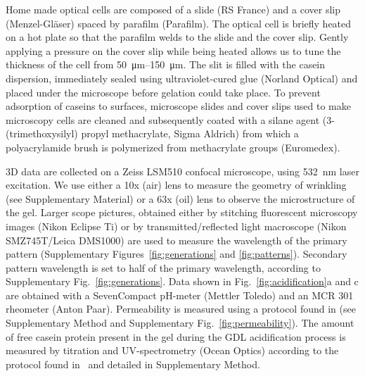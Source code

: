 \documentclass[twocolumn,superscriptaddress,showpacs,preprintnumbers,
amsmath,amssymb,prl]{revtex4-1}
\begin{document}
Home made optical cells are composed of a slide (RS France) and a cover slip (Menzel-Gl\"aser) spaced by parafilm (Parafilm). The optical cell is briefly heated on a hot plate so that the parafilm welds to the slide and the cover slip. Gently applying a pressure on the cover slip while being heated allows us to tune the thickness of the cell from \SIrange{50}{150}{\micro\metre}. The slit is filled with the casein dispersion, immediately sealed using ultraviolet-cured glue (Norland Optical) and placed under the microscope before gelation could take place. To prevent adsorption of caseins to surfaces, microscope slides and cover slips used to make microscopy cells are cleaned and subsequently coated with a silane agent (3-(trimethoxysilyl) propyl methacrylate, Sigma Aldrich) from which a polyacrylamide brush is polymerized from methacrylate groups (Euromedex).

3D data are collected on a Zeiss LSM510 confocal microscope, using \SI{532}{\nano\meter} laser excitation. We use either a 10x (air) lens to measure the geometry of wrinkling (see Supplementary Material) or a 63x (oil) lens to observe the microstructure of the gel. Larger scope pictures, obtained either by stitching fluorescent microscopy images (Nikon Eclipse Ti) or by transmitted/reflected light macroscope (Nikon SMZ745T/Leica DMS1000) are used to measure the wavelength of the primary pattern (Supplementary Figures~\ref{fig:generations} and \ref{fig:patterns}). Secondary pattern wavelength is set to half of the primary wavelength, according to Supplementary Fig.~\ref{fig:generations}.
Data shown in Fig.~\ref{fig:acidification}a and c are obtained with a SevenCompact pH-meter (Mettler Toledo) and an MCR 301 rheometer (Anton Paar).
Permeability is measured using a protocol found in \cite{VanDijk1986} (see Supplementary Method and Supplementary Fig.~\ref{fig:permeability}). The amount of free casein protein present in the gel during the GDL acidification process is measured by titration and UV-spectrometry (Ocean Optics) according to the protocol found in~\cite{Roefs1986} and detailed in Supplementary Method.



\end{document}
